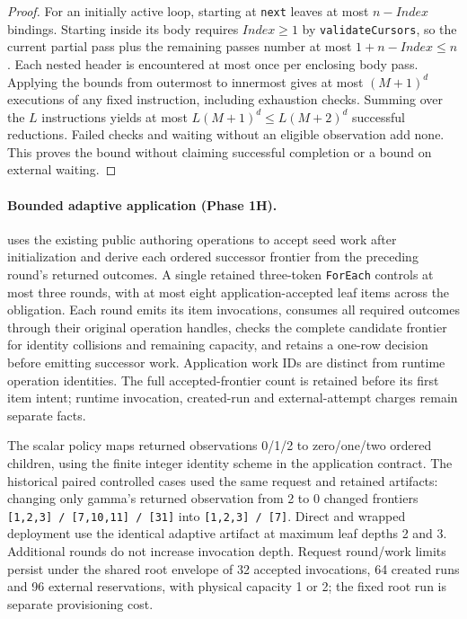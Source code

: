 \documentclass[11pt,a4paper]{article}
\theoremstyle{definition}
\theoremstyle{remark}
\begin{document}
\begin{proof}
For an initially active loop, starting at \texttt{next} leaves at most $n-\mathit{Index}$ bindings. Starting inside its body requires $\mathit{Index}\ge1$ by \texttt{validateCursors}, so the current partial pass plus the remaining passes number at most $1+n-\mathit{Index}\le n$. Each nested header is encountered at most once per enclosing body pass. Applying the bounds from outermost to innermost gives at most $(M+1)^d$ executions of any fixed instruction, including exhaustion checks. Summing over the $L$ instructions yields at most $L(M+1)^d\le L(M+2)^d$ successful reductions. Failed checks and waiting without an eligible observation add none. This proves the bound without claiming successful completion or a bound on external waiting.
\end{proof}

\paragraph{Bounded adaptive application (Phase 1H).}  uses the existing public authoring operations to accept seed work after initialization and derive each ordered successor frontier from the preceding round's returned outcomes. A single retained three-token \texttt{ForEach} controls at most three rounds, with at most eight application-accepted leaf items across the obligation. Each round emits its item invocations, consumes all required outcomes through their original operation handles, checks the complete candidate frontier for identity collisions and remaining capacity, and retains a one-row decision before emitting successor work. Application work IDs are distinct from runtime operation identities. The full accepted-frontier count is retained before its first item intent; runtime invocation, created-run and external-attempt charges remain separate facts.

The scalar policy maps returned observations 0/1/2 to zero/one/two ordered children, using the finite integer identity scheme in the application contract. The historical paired controlled cases used the same request and retained artifacts: changing only gamma's returned observation from 2 to 0 changed frontiers \texttt{[1,2,3] / [7,10,11] / [31]} into \texttt{[1,2,3] / [7]}. Direct and wrapped deployment use the identical adaptive artifact at maximum leaf depths 2 and 3. Additional rounds do not increase invocation depth. Request round/work limits persist under the shared root envelope of 32 accepted invocations, 64 created runs and 96 external reservations, with physical capacity 1 or 2; the fixed root run is separate provisioning cost.
\end{document}
